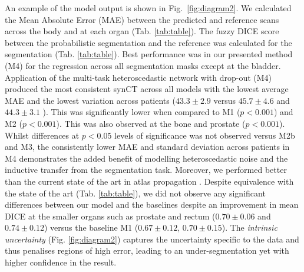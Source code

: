An example of the model output is shown in Fig.~\ref{fig:diagram2}. We calculated the Mean Absolute Error (MAE) between the predicted and reference scans across the body and at each organ (Tab. \ref{tab:table}). The fuzzy DICE score between the probabilistic segmentation and the reference was calculated for the segmentation (Tab. \ref{tab:table}). Best performance was in our presented method (M4) for the regression across all segmentation masks except at the bladder. Application of the multi-task heteroscedastic network with drop-out (M4) produced the most consistent synCT across all models with the lowest average MAE and the lowest variation across patients ($43.3\pm2.9$ versus $45.7\pm4.6$ \cite{ninon2017} and $44.3\pm3.1$ \cite{kendall2017multi}). This was significantly lower when compared to M1 ($p<0.001$) and M2 ($p<0.001$). This was also observed at the bone and prostate ($p<0.001$). Whilst differences at $p<0.05$ levels of significance was not observed versus M2b and M3, the consistently lower MAE and standard deviation across patients in M4 demonstrates the added benefit of modelling heteroscedastic noise and the inductive transfer from the segmentation task. Moreover, we performed better than the current state of the art in atlas propagation \cite{ninon2017}. Despite equivalence with the state of the art (Tab. \ref{tab:table}), we did not observe any significant differences between our model and the baselines despite an improvement in mean DICE at the smaller organs such as prostate and rectum ($0.70\pm0.06$ and $0.74\pm0.12$) versus the baseline M1 ($0.67\pm0.12$, $0.70\pm0.15$). The \emph{intrinsic uncertainty} (Fig. \ref{fig:diagram2}) captures the uncertainty specific to the data and thus penalises regions of high error, leading to an under-segmentation yet with higher confidence in the result.

%
%


